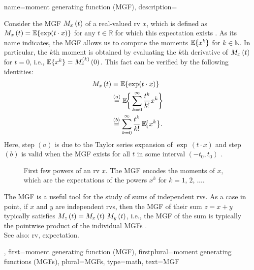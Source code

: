{name={moment generating function (MGF)}, 
	description={Consider the MGF $M_{x}\left(t\right)$ 
	 	of a real-valued \gls{rv} $x$, which is defined as
	 	$M_{x}\left(t\right) = \mathbb{E} \{ \exp(t \cdot x) \}$ for any $t \in \mathbb{R}$ 
	 	for which this \gls{expectation} exists \cite[Sec. 21]{BillingsleyProbMeasure}. 
		As its name indicates, the MGF allows us to compute the moments 
	 	$\mathbb{E}\{ x^{k} \}$ for $k \in \mathbb{N}$. 
	 	In particular, the $k$th moment is obtained by evaluating the $k$th 
	 	\gls{derivative} of $M_{x}\left(t\right)$ for $t=0$, i.e., $\mathbb{E}\{ x^{k} \} = M_{x}^{(k)}\left(0\right)$. 
	 	This fact can be verified by the following identities: 
	 	\begin{align}
			M_{x}\left(t\right) & =\mathbb{E}\{ \exp(t \cdot x)  \} \nonumber \\ 
			& \stackrel{(a)}{=} \mathbb{E}\!\bigg\{\sum_{k=0}^{\infty} \frac{t^{k}}{k!} x^{k}\bigg\}  \nonumber \\ 
			& \stackrel{(b)}{=}  \sum_{k=0}^{\infty} \frac{t^{k}}{k!}\, \mathbb{E}\!\big\{ x^{k} \big\}. \nonumber
	 	\end{align}
	 	Here, step $(a)$ is due to the Taylor series expansion of 
	 	$\exp\,(t \cdot x)$ and step $(b)$ is valid when the MGF exists 
	 	for all $t$ in some interval $(-t_{0},t_{0})$ \cite[p. 278]{BillingsleyProbMeasure}.
	 	\begin{figure}[H]
			\centering
		\caption{First few powers of an \gls{rv} $x$. The MGF 
			encodes the moments of $x$, which are the \glspl{expectation} 
			of the powers $x^{k}$ for $k=1,\,2,\,\ldots$.}
		\end{figure}
		The MGF is a useful tool for the study of sums of independent 
		\glspl{rv}. As a case in point, if $x$ and $y$ are independent 
		\glspl{rv}, then the MGF of their sum $z = x + y$ typically 
		satisfies $M_{z}\left(t\right) = M_{x}\left(t\right)\,M_{y}\left(t\right)$,
        		i.e., the MGF of the sum is typically the pointwise product of the 
		individual MGFs \cite[p.~280]{BillingsleyProbMeasure}.
		\\
 		See also: \gls{rv}, \gls{expectation}. }, 
 	first={moment generating function (MGF)}, 
 	firstplural={moment generating functions (MGFs)}, 
 	plural={MGFs}, 
 	type=math, 
 	text={MGF}
} 

